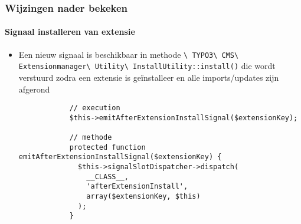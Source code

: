 \begin{frame}[fragile]
	\frametitle{Wijzingen nader bekeken}
	\framesubtitle{Signaal installeren van extensie}

	\lstset{basicstyle=\tiny\ttfamily}

	\begin{itemize}

		\item Een nieuw signaal is beschikbaar in methode
			\smaller
				\texttt{\textbackslash
					TYPO3\textbackslash
					CMS\textbackslash
					Extensionmanager\textbackslash
					Utility\textbackslash
					InstallUtility::install()}
			\normalsize
			die wordt verstuurd zodra een extensie is geïnstalleer en alle imports/updates
			zijn afgerond

		\begin{lstlisting}
			// execution
			$this->emitAfterExtensionInstallSignal($extensionKey);

			// methode
			protected function emitAfterExtensionInstallSignal($extensionKey) {
			  $this->signalSlotDispatcher->dispatch(
			    __CLASS__,
			    'afterExtensionInstall',
			    array($extensionKey, $this)
			  );
			}
		\end{lstlisting}

	\end{itemize}

\end{frame}

